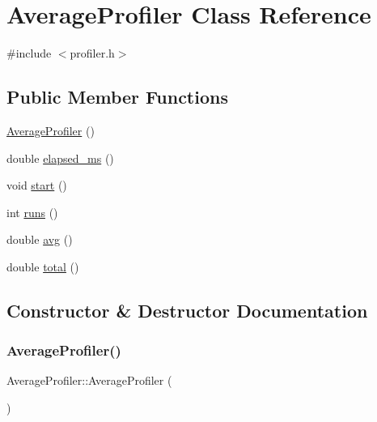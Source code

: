 \hypertarget{class_average_profiler}{}\section{Average\+Profiler Class Reference}
\label{class_average_profiler}


{\ttfamily \#include $<$profiler.\+h$>$}

\subsection*{Public Member Functions}
\begin{DoxyCompactItemize}
\item 
\mbox{\hyperlink{class_average_profiler_a78dcb72e00b838a69684c40f65e31a12}{Average\+Profiler}} ()
\item 
double \mbox{\hyperlink{class_average_profiler_afee887bfb70db5f4aa5b6c89410f3afd}{elapsed\+\_\+ms}} ()
\item 
void \mbox{\hyperlink{class_average_profiler_a54c2750ae4d16c16a37c4ad74fd9d03f}{start}} ()
\item 
int \mbox{\hyperlink{class_average_profiler_a02d7a84f759b0c57680867676296b081}{runs}} ()
\item 
double \mbox{\hyperlink{class_average_profiler_a44a2bd6dd39a03a16bf72d11cf17758a}{avg}} ()
\item 
double \mbox{\hyperlink{class_average_profiler_a14a00487f5dbaf642e57afc4c8c79540}{total}} ()
\end{DoxyCompactItemize}


\subsection{Constructor \& Destructor Documentation}
\mbox{\label{class_average_profiler_a78dcb72e00b838a69684c40f65e31a12}} 
\subsubsection{\texorpdfstring{AverageProfiler()}{AverageProfiler()}}
{\footnotesize\ttfamily Average\+Profiler\+::\+Average\+Profiler (\begin{DoxyParamCaption}{ }\end{DoxyParamCaption})\hspace{0.3cm}{\ttfamily [inline]}}




